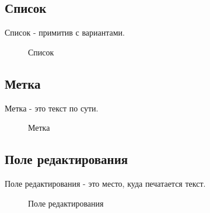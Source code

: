 \documentclass[14pt]{extarticle}
\begin{document}
	\subsection{Список}
	Список - примитив с вариантами.
		\begin{figure}[h]
		\caption{Список}
		\label{ris:image}
		\end{figure}	
	
	\subsection{Метка}
		Метка - это текст по сути.
		\begin{figure}[h]
		\caption{ Метка }
		\label{ris:image}
		\end{figure}	

	\subsection{Поле редактирования}
		Поле редактирования - это место, куда печатается текст.
		\begin{figure}[h]
		\caption{ Поле редактирования }
		\label{ris:image}
		\end{figure}	
\end{document}
